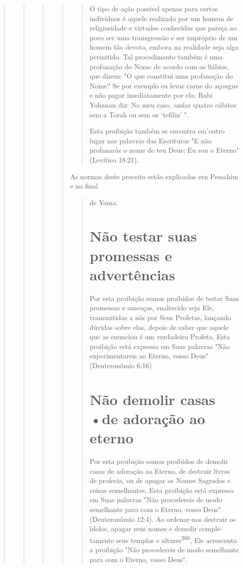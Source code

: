 \begin{quote}
\begin{quote}
\begin{quote}
\begin{quote}
\begin{quote}
O tipo de ação possível apenas para certos indivíduos é aquele
reali­zado por um homem de religiosidade e virtudes conhecidas que
pareça ao po­vo ser uma transgressão e ser impróprio de um homem tão
devoto, embora na realidade seja algo permitido. Tal procedimento também
é uma profanação do Nome de acordo com os Sábios, que dizem: "O que
constitui uma profana­ção do Nome? Se por exemplo eu levar carne do
açougue e não pagar imediata­mente por ela. Rabi Yohanan diz: No meu
caso, andar quatro cúbitos sem a Torah ou sem os `tefilin' ".

Esta proibição também se encontra em'outro lugar nas palavras das
Escrituras "E não profanarás o nome de teu Deus; Eu sou o Eterno"
(Levítico 18:21).
\end{quote}

As normas deste preceito estão explicadas ern Pessahim e no final

\begin{quote}
de Yoma.

\section{Não testar suas promessas e advertências}

Por esta proibição somos proibidos de testar Suas promessas e amea­ças,
enaltecido seja Ele, transmitidas a nós por Seus Profetas, lançando
dúvidas sobre elas, depois de saber que aquele que as enunciou é um
verdadeiro Profe­ta. Esta proibição está expressa em Suas palavras "Não
experimentareis ao Eter­no, vosso Deus" (Deuteronômio 6:16)

\section{Não demolir casas •de adoração ao eterno}

Por esta proibição somos proibidos de demolir casas de adoração ao
Eterno, de destruir livros de profecia, ou de apagar os Nomes Sagrados e
coisas semelhantes. Esta proibição está expressa em Suas palavras "Não
proce­dereis de modo semelhante para com o Eterno, vosso Deus"
(Deuteronômio 12:4). Ao ordenar-nos destruir os ídolos, apagar seus
nomes e demolir comple­tamente seus templos e
altares\textsuperscript{260}, Ele acrescenta a proibição "Não
procedereis de modo semelhante para com o Eterno, vosso Deus".


\end{quote}
\end{quote}
\end{quote}
\end{quote}
\end{quote}
